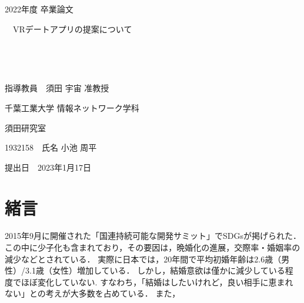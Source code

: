 \documentclass[12pt,a4j,titlepage]{ltjsarticle}
\begin{document}
\begin{titlepage}
  \begin{center}
  
    \vspace*{20truept}
    
    {\LARGE 2022年度 卒業論文} 
    
    \vspace*{75truept}
    
    {\Huge 　VRデートアプリの提案について}　%

    \vspace{10truept}

    {\Huge }　%

    \vspace{10truept}

    {\Huge }　%

    \vspace{85truept}
    
    {\LARGE 指導教員　須田 宇宙 准教授}
    
    \vspace{60truept}
    
    {\LARGE 千葉工業大学 情報ネットワーク学科}
    
    \vspace{15truept}
    
    {\LARGE 須田研究室}
    
    \vspace{70truept}
    
    {\LARGE 1932158　氏名 小池 周平 }　%

    \vspace{70truept}
    
  \end{center}
  \begin{flushright}

    {\LARGE 提出日　2023年1月17日}
  
  \end{flushright}
\end{titlepage}

\setcounter{tocdepth}{3}
\tableofcontents
\listoftables
\listoffigures
\clearpage

\section{緒言}\label{緒言}
2015年9月に開催された「国連持続可能な開発サミット」でSDGsが掲げられた．この中に少子化も含まれており，その要因は，晩婚化の進展\cite{sasaki2012}，交際率・婚姻率の減少\cite{naikakufu2019}などとされている．
実際に日本では，20年間で平均初婚年齢は2.6歳（男性）/3.1歳（女性）増加している．
しかし，結婚意欲は僅かに減少している程度でほぼ変化していない.
すなわち，「結婚はしたいけれど，良い相手に恵まれない」との考えが大多数を占めている\cite{naikakufu2019}．
また，
\end{document}
